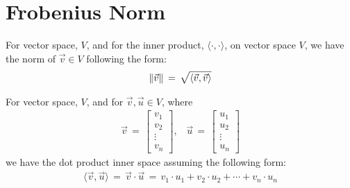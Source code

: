 \section{Frobenius Norm}

\begin{definition}
    For vector space, $V$, and for the inner product, $\langle \cdot, \cdot \rangle$, on vector space $V$, we have the norm of $\vec{v} \in V$ following the form:
    \begin{align*}
        \left\lVert\vec{v}\right\rVert \hspace{2pt} = \hspace{2pt} \sqrt{\langle \vec{v}, \vec{v} \rangle}
    \end{align*}
\end{definition}

\begin{definition}
    For vector space, $V$, and for $\vec{v}, \vec{u} \in V$, where 
    \begin{align*}
        \vec{v} \hspace{2pt} = \hspace{2pt} \begin{bmatrix}
            v_{1}\\ 
            v_{2}\\ 
            \vdots\\
            v_{n}
        \end{bmatrix}, \hspace{10pt}
        \vec{u} \hspace{2pt} = \hspace{2pt}
        \begin{bmatrix}
            u_{1}\\
            u_{2}\\
            \vdots\\
            u_{n}
        \end{bmatrix}
    \end{align*}
    we have the dot product inner space assuming the following form:
    \begin{align*}
        \langle \vec{v}, \vec{u} \rangle \hspace{2pt} = \hspace{2pt} \vec{v} \cdot \vec{u} \hspace{2pt} = \hspace{2pt} v_{1} \cdot u_{1} + v_{2} \cdot u_{2} + \cdots + v_{n} \cdot u_{n}
    \end{align*}
\end{definition}

